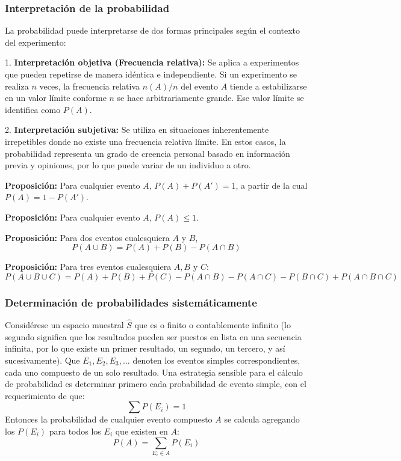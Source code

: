\documentclass[a4paper]{article}
\begin{document}
\subsubsection{Interpretación de la probabilidad}

La probabilidad puede interpretarse de dos formas principales según el contexto del experimento:

1. \textbf{Interpretación objetiva (Frecuencia relativa):} Se aplica a experimentos que pueden repetirse de manera idéntica e independiente. Si un experimento se realiza $n$ veces, la frecuencia relativa $n(A)/n$ del evento $A$ tiende a estabilizarse en un valor límite conforme $n$ se hace arbitrariamente grande. Ese valor límite se identifica como $P(A)$.

2. \textbf{Interpretación subjetiva:} Se utiliza en situaciones inherentemente irrepetibles donde no existe una frecuencia relativa límite. En estos casos, la probabilidad representa un grado de creencia personal basado en información previa y opiniones, por lo que puede variar de un individuo a otro.

\textbf{Proposición:}
Para cualquier evento $A$, $P(A) + P(A') = 1$, a partir de la cual $P(A) = 1 - P(A')$. 

\textbf{Proposición:}
Para cualquier evento $A$, $P(A) \le 1$.

\textbf{Proposición:}
Para dos eventos cualesquiera $A$ y $B$,
$$ P(A \cup B) = P(A) + P(B) - P(A \cap B) $$

\textbf{Proposición:}
Para tres eventos cualesquiera $A, B$ y $C$:
$$ P(A \cup B \cup C) = P(A) + P(B) + P(C) - P(A \cap B) - P(A \cap C) - P(B \cap C) + P(A \cap B \cap C) $$

\subsubsection{Determinación de probabilidades sistemáticamente}

Considérese un espacio muestral $\hat{S}$ que es o finito o contablemente infinito (lo segundo significa que los resultados pueden ser puestos en lista en una secuencia infinita, por lo que existe un primer resultado, un segundo, un tercero, y así sucesivamente). Que $E_1, E_2, E_3, \dots$ denoten los eventos simples correspondientes, cada uno compuesto de un solo resultado. Una estrategia sensible para el cálculo de probabilidad es determinar primero cada probabilidad de evento simple, con el requerimiento de que:
$$ \sum P(E_i) = 1 $$
Entonces la probabilidad de cualquier evento compuesto $A$ se calcula agregando los $P(E_i)$ para todos los $E_i$ que existen en $A$:
$$ P(A) = \sum_{E_i \in A} P(E_i) $$
\end{document}
